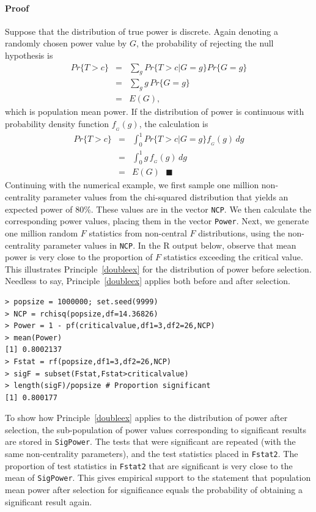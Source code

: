 \documentclass[jou]{apa6} %
\begin{document}
\paragraph{Proof} 
Suppose that the distribution of true power is discrete. Again denoting a randomly chosen power value by $G$, the probability of rejecting the null hypothesis is 
\begin{eqnarray} \label{ExpectedPow}
    Pr\{T>c\} & = & \sum_g Pr\{T>c|G=g\} Pr\{G=g\}  \nonumber \\
    & = & \sum_g g \, Pr\{G=g\}  \nonumber \\
    & = & E(G),
\end{eqnarray}
which is population mean power. If the distribution of power is continuous with probability density function $f_{_G}(g)$, the calculation is 
\begin{eqnarray*}
    Pr\{T>c\} & = & \int_0^1 Pr\{T>c|G=g\} f_{_G}(g) \, dg \\
    & = & \int_0^1 g \, f_{_G}(g) \, dg \\
    & = & E(G) ~~~\blacksquare
\end{eqnarray*}
Continuing with the numerical example, we first sample one million non-centrality parameter values from the chi-squared distribution that yields an expected power of 80\%. These values are in the vector \texttt{NCP}. We then calculate the corresponding power values, placing them in the vector \texttt{Power}. Next, we generate one million random $F$ statistics from non-central $F$ distributions, using the non-centrality parameter values in \texttt{NCP}. In the R output below, observe that mean power is very close to the proportion of $F$ statistics exceeding the critical value. This illustrates Principle~\ref{doubleex} for the distribution of power before selection. Needless to say, Principle~\ref{doubleex} applies both before and after selection. 

{\footnotesize
\begin{verbatim}
> popsize = 1000000; set.seed(9999)
> NCP = rchisq(popsize,df=14.36826)
> Power = 1 - pf(criticalvalue,df1=3,df2=26,NCP)
> mean(Power)
[1] 0.8002137
> Fstat = rf(popsize,df1=3,df2=26,NCP)
> sigF = subset(Fstat,Fstat>criticalvalue)
> length(sigF)/popsize # Proportion significant
[1] 0.800177
\end{verbatim}
} %

To show how Principle~\ref{doubleex} applies to the distribution of power after selection, the sub-population of power values corresponding to significant results are stored in \texttt{SigPower}. The tests that were significant are repeated (with the same non-centrality parameters), and the test statistics placed in \texttt{Fstat2}. The proportion of test statistics in \texttt{Fstat2} that are significant is very close to the mean of \texttt{SigPower}. This gives empirical support to the statement that population mean power after selection for significance equals the probability of obtaining a significant result again.
\end{document}
